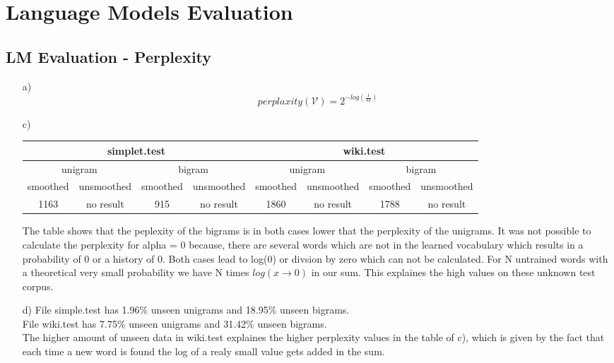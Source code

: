 \documentclass{article}
\begin{document}
\section{Language Models Evaluation}
\subsection{LM Evaluation - Perplexity}
\begin{itemize}
	\item[a)]
		$$perplaxity(\mathcal{V}) = 2^{-log(\frac{1}{M})}$$
	\item[c)]
		\begin{table}
		\begin{adjustbox}{width=\columnwidth,center}
		\begin{tabular}{|c|c|c|c||c|c|c|c|}
		\hline
		\multicolumn{4}{|c||}{simplet.test}&\multicolumn{4}{c|}{wiki.test}\\\hline\hline
		\multicolumn{2}{|c|}{unigram}&\multicolumn{2}{c||}{bigram}&\multicolumn{2}{c|}{unigram}&\multicolumn{2}{c|}{bigram}\\\hline
		smoothed & unsmoothed & smoothed & unsmoothed &smoothed & unsmoothed & smoothed & unsmoothed\\\hline
		1163&no result &915&no result&1860&no result&1788&no result\\\hline 
		\end{tabular}
		\end{adjustbox}
		\end{table}
		The table shows that the peplexity of the bigrams is in both cases lower that the perplexity of the unigrams. It was not possible to calculate the perplexity for alpha = 0 because, there are several words which are not in the learned vocabulary which results in a probability of 0 or a history of 0. Both cases lead to log(0) or divsion by zero which can not be calculated. For N untrained words with a theoretical very small probability we have N times $log(x\rightarrow0)$ in our sum. This explaines the high values on these unknown test corpus. 
		\item[d)]
		File simple.test has 1.96\% unseen unigrams and 18.95\% unseen bigrams.\\
		File wiki.test has 7.75\% unseen unigrams and 31.42\% unseen bigrams.\\
		The higher amount of unseen data in wiki.test explaines the higher perplexity values in the table of c), which is given by the fact that each time a new word is found the log of a realy small value gets added in the sum.

\end{itemize}
\end{document}
